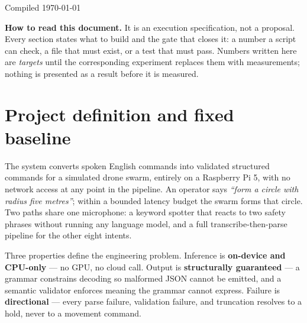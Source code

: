 \documentclass[11pt,a4paper]{article}
\newenvironment{panel}
  {\par\begin{center}\begin{lrbox}{\panelbox}\begin{minipage}{0.94\textwidth}\vspace{3pt}}
  {\vspace{3pt}\end{minipage}\end{lrbox}%
   \fcolorbox{rulegray}{panelbg}{\usebox{\panelbox}}\end{center}\par}
\begin{document}
\begin{titlepage}
\vfill
{\small Compiled \today}
\end{titlepage}

\tableofcontents
\newpage

\begin{panel}
\textbf{How to read this document.} It is an execution specification, not a proposal. Every section
states what to build and the gate that closes it: a number a script can check, a file that must exist,
or a test that must pass. Numbers written here are \emph{targets} until the corresponding experiment
replaces them with measurements; nothing is presented as a result before it is measured.
\end{panel}

\section{Project definition and fixed baseline}
\label{sec:baseline}

The system converts spoken English commands into validated structured commands for a simulated drone
swarm, entirely on a Raspberry Pi 5, with no network access at any point in the pipeline. An operator
says \emph{``form a circle with radius five metres''}; within a bounded latency budget the swarm forms
that circle. Two paths share one microphone: a keyword spotter that reacts to two safety phrases without
running any language model, and a full transcribe-then-parse pipeline for the other eight intents.

Three properties define the engineering problem. Inference is \textbf{on-device and CPU-only} --- no GPU,
no cloud call. Output is \textbf{structurally guaranteed} --- a grammar constrains decoding so malformed
JSON cannot be emitted, and a semantic validator enforces meaning the grammar cannot express. Failure is
\textbf{directional} --- every parse failure, validation failure, and truncation resolves to a hold, never
to a movement command.
\end{document}
